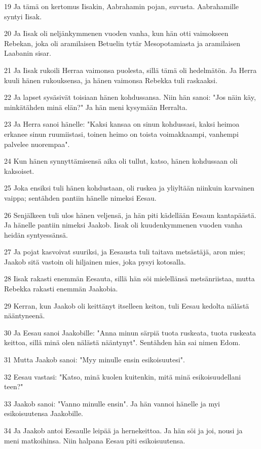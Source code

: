 \par 19 Ja tämä on kertomus Iisakin, Aabrahamin pojan, suvusta. Aabrahamille syntyi Iisak.
\par 20 Ja Iisak oli neljänkymmenen vuoden vanha, kun hän otti vaimokseen Rebekan, joka oli aramilaisen Betuelin tytär Mesopotamiasta ja aramilaisen Laabanin sisar.
\par 21 Ja Iisak rukoili Herraa vaimonsa puolesta, sillä tämä oli hedelmätön. Ja Herra kuuli hänen rukouksensa, ja hänen vaimonsa Rebekka tuli raskaaksi.
\par 22 Ja lapset sysäsivät toisiaan hänen kohdussansa. Niin hän sanoi: "Jos näin käy, minkätähden minä elän?" Ja hän meni kysymään Herralta.
\par 23 Ja Herra sanoi hänelle: "Kaksi kansaa on sinun kohdussasi, kaksi heimoa erkanee sinun ruumiistasi, toinen heimo on toista voimakkaampi, vanhempi palvelee nuorempaa".
\par 24 Kun hänen synnyttämisensä aika oli tullut, katso, hänen kohdussaan oli kaksoiset.
\par 25 Joka ensiksi tuli hänen kohdustaan, oli ruskea ja yliyltään niinkuin karvainen vaippa; sentähden pantiin hänelle nimeksi Eesau.
\par 26 Senjälkeen tuli ulos hänen veljensä, ja hän piti kädellään Eesaun kantapäästä. Ja hänelle pantiin nimeksi Jaakob. Iisak oli kuudenkymmenen vuoden vanha heidän syntyessänsä.
\par 27 Ja pojat kasvoivat suuriksi, ja Eesausta tuli taitava metsästäjä, aron mies; Jaakob sitä vastoin oli hiljainen mies, joka pysyi kotosalla.
\par 28 Iisak rakasti enemmän Eesauta, sillä hän söi mielellänsä metsänriistaa, mutta Rebekka rakasti enemmän Jaakobia.
\par 29 Kerran, kun Jaakob oli keittänyt itselleen keiton, tuli Eesau kedolta nälästä nääntyneenä.
\par 30 Ja Eesau sanoi Jaakobille: "Anna minun särpiä tuota ruskeata, tuota ruskeata keittoa, sillä minä olen nälästä nääntynyt". Sentähden hän sai nimen Edom.
\par 31 Mutta Jaakob sanoi: "Myy minulle ensin esikoisuutesi".
\par 32 Eesau vastasi: "Katso, minä kuolen kuitenkin, mitä minä esikoisuudellani teen?"
\par 33 Jaakob sanoi: "Vanno minulle ensin". Ja hän vannoi hänelle ja myi esikoisuutensa Jaakobille.
\par 34 Ja Jaakob antoi Eesaulle leipää ja hernekeittoa. Ja hän söi ja joi, nousi ja meni matkoihinsa. Niin halpana Eesau piti esikoisuutensa.

